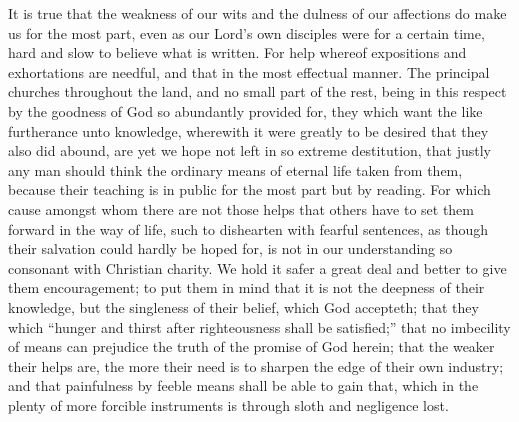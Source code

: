 It is true that the weakness of our wits and the dulness of our affections do make us for the most part, even as our Lord’s own disciples were for a certain time, hard and slow to believe what is written. For help whereof expositions and exhortations are needful, and that in the most effectual manner. The principal churches throughout the land, and no small part of the rest, being in this respect by the goodness of God so abundantly provided for, they which want the like furtherance unto knowledge, wherewith it were greatly to be desired that they also did abound, are yet we hope not left in so extreme destitution, that justly any man should think the ordinary means of eternal life taken from them, because their teaching is in public for the most part but by reading. For which cause amongst whom there are not those helps that others have to set them forward in the way of life, such to dishearten with fearful sentences, as though their salvation could hardly be hoped for, is not in our understanding so consonant with Christian charity.  We hold it safer a great deal and better to give them encouragement; to put them in mind that it is not the deepness of their knowledge, but the singleness of their belief, which God accepteth; that they which “hunger and thirst after righteousness shall be satisfied;” that no imbecility of means can prejudice the truth of the promise of God herein; that the weaker their helps are, the more their need is to sharpen the edge of their own industry; and that painfulness by feeble means shall be able to gain that, which in the plenty of more forcible instruments is through sloth and negligence lost.
